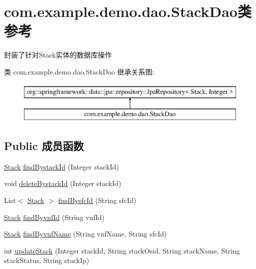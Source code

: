 \hypertarget{interfacecom_1_1example_1_1demo_1_1dao_1_1_stack_dao}{}\section{com.\+example.\+demo.\+dao.\+Stack\+Dao类 参考}
\label{interfacecom_1_1example_1_1demo_1_1dao_1_1_stack_dao}


封装了针对\+Stack实体的数据库操作  


类 com.\+example.\+demo.\+dao.\+Stack\+Dao 继承关系图\+:\begin{figure}[H]
\begin{center}
\leavevmode
\includegraphics[height=2.000000cm]{interfacecom_1_1example_1_1demo_1_1dao_1_1_stack_dao}
\end{center}
\end{figure}
\subsection*{Public 成员函数}
\begin{DoxyCompactItemize}
\item 
\mbox{\hyperlink{classcom_1_1example_1_1demo_1_1modular_1_1_stack}{Stack}} \mbox{\hyperlink{interfacecom_1_1example_1_1demo_1_1dao_1_1_stack_dao_a4f7310088b8fdccdcc0084d8f2f75a9e}{find\+Bystack\+Id}} (Integer stack\+Id)
\item 
void \mbox{\hyperlink{interfacecom_1_1example_1_1demo_1_1dao_1_1_stack_dao_aadaa710a46eff94a3a5a847ccce05f76}{delete\+Bystack\+Id}} (Integer stack\+Id)
\item 
List$<$ \mbox{\hyperlink{classcom_1_1example_1_1demo_1_1modular_1_1_stack}{Stack}} $>$ \mbox{\hyperlink{interfacecom_1_1example_1_1demo_1_1dao_1_1_stack_dao_a507e96395060add288019cdc1a6e18b3}{find\+Bysfc\+Id}} (String sfc\+Id)
\item 
\mbox{\hyperlink{classcom_1_1example_1_1demo_1_1modular_1_1_stack}{Stack}} \mbox{\hyperlink{interfacecom_1_1example_1_1demo_1_1dao_1_1_stack_dao_a6b21413e546df384f540a650c936f676}{find\+Byvnf\+Id}} (String vnf\+Id)
\item 
\mbox{\hyperlink{classcom_1_1example_1_1demo_1_1modular_1_1_stack}{Stack}} \mbox{\hyperlink{interfacecom_1_1example_1_1demo_1_1dao_1_1_stack_dao_a33cc52a138be1713c465af88125ec410}{find\+Byvnf\+Name}} (String vnf\+Name, String sfc\+Id)
\item 
int \mbox{\hyperlink{interfacecom_1_1example_1_1demo_1_1dao_1_1_stack_dao_afe823d139ca863dcdf952bb7b4afa2d2}{update\+Stack}} (Integer stack\+Id, String stack\+Osid, String stack\+Name, String stack\+Status, String stack\+Ip)
\end{DoxyCompactItemize}


